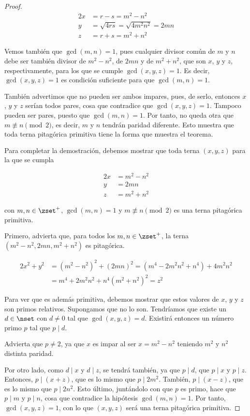 \begin{proof}
  \begin{alignat*}{2}
    x &= r - s = m^2 - n^2 \\
    y &= \sqrt{4rs} = \sqrt{4m^2n^2} = 2mn \\
    z &= r + s = m^2 + n^2
  \end{alignat*}

  Vemos también que $\gcd(m, n) = 1$, pues cualquier divisor común de $m$ y
  $n$ debe ser también divisor de $m^2 - n^2$, de $2mn$ y de $m^2 + n^2$,
  que son $x$, $y$ y $z$, respectivamente, para los que se cumple $\gcd(x,
  y, z) = 1$. Es decir, $\gcd(x, y, z) = 1$ es condición suficiente para que
  $\gcd(m, n) = 1$.

  También advertimos que no pueden ser ambos impares, pues, de serlo,
  entonces $x$, $y$ y $z$ serían todos pares, cosa que contradice que
  $\gcd(x, y, z) = 1$. Tampoco pueden ser pares, puesto que $\gcd(m, n) =
  1$. Por tanto, no queda otra que $m \not\equiv n \pmod 2$, es decir, $m$ y
  $n$ tendrán paridad diferente. Esto muestra que toda terna pitagórica
  primitiva tiene la forma que muestra el teorema.

  Para completar la demostración, debemos mostrar que toda terna $(x, y, z)$
  para la que se cumpla

  \begin{alignat*}{2}
    x &= m^2 - n^2 \\
    y &= 2mn \\
    z &= m^2 + n^2
  \end{alignat*}

  \noindent con $m, n \in \zset^{+}$, $\gcd(m, n) = 1$ y $m \not\equiv n
  \pmod 2$ es una terna pitagórica primitiva.

  Primero, advierta que, para todos los $m, n \in \zset^{+}$, la terna $(m^2
  - n^2, 2mn, m^2 + n^2)$ es pitagórica.

  \begin{alignat*}{2}
    x^2 + y^2 &= (m^2 - n^2)^2 + (2mn)^2 = (m^4 - 2m^2n^2 + n^4) +
      4m^2n^2 \\
              &= m^4 + 2m^2n^2 + n^4 (m^2 + n^2)^2 = z^2
  \end{alignat*}

  Para ver que es además primitiva, debemos mostrar que estos valores de
  $x$, $y$ y $z$ son primos relativos. Supongamos que no lo son. Tendríamos
  que existe un $d \in \nset$ con $d \neq 0$ tal que $\gcd(x, y, z) = d$.
  Existirá entonces un número primo $p$ tal que $p \mid d$.

  Advierta que $p \neq 2$, ya que $x$ es impar al ser $x = m^2 - n^2$
  teniendo $m^2$ y $n^2$ distinta paridad.

  Por otro lado, como $d \mid x$ y $d \mid z$, se tendrá también, ya que $p
  \mid d$, que $p \mid x$ y $p \mid z$. Entonces, $p \mid (x + z)$, que es
  lo mismo que $p \mid 2m^2$. También, $p \mid (x - z)$, que es lo mismo que
  $p \mid 2n^2$. Esto último, juntándolo con que $p$ es primo, hace que $p
  \mid m$ y $p \mid n$, cosa que contradice la hipótesis $\gcd(m, n) = 1$.
  Por tanto, $\gcd(x, y, z) = 1$, con lo que $(x, y, z)$ será una terna
  pitagórica primitiva.
\end{proof}

